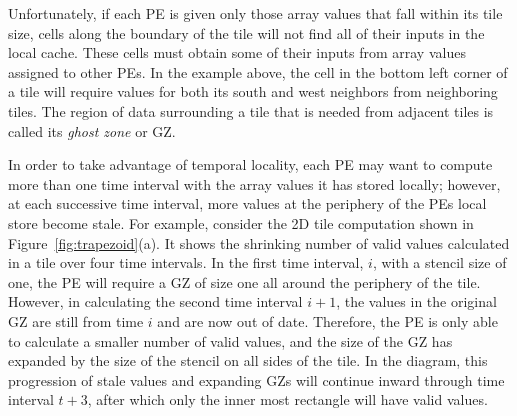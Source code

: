 \documentclass{sig-alternate}
\begin{document}
Unfortunately, if each PE is given only those array values that fall within
its tile size, cells along the boundary of the tile will not find all of
their inputs in the local cache.  These cells must obtain some of their
inputs from array values assigned to other PEs.  In the example above, the
cell in the bottom left corner of a tile will require values for both its
south and west neighbors from neighboring tiles.  The region of data
surrounding a tile that is needed from adjacent tiles is called its {\em
  ghost zone} or GZ.

In order to take advantage of temporal locality, each PE may want to compute
more than one time interval with the array values it has stored locally;
however, at each successive time interval, more values at the periphery of
the PEs local store become stale.  For example, consider the 2D tile
computation shown in Figure~\ref{fig:trapezoid}(a).  It shows the shrinking
number of valid values calculated in a tile over four time intervals.  In the
first time interval, $i$, with a stencil size of one, the PE will require a GZ
of size one all around the periphery of the tile.  However, in calculating
the second time interval $i+1$, the values in the original GZ are still from
time $i$ and are now out of date.  Therefore, the PE is only able to
calculate a smaller number of valid values, and the size of the GZ has
expanded by the size of the stencil on all sides of the tile.  In the
diagram, this progression of stale values and expanding GZs will continue
inward through time interval $t+3$, after which only the inner most rectangle
will have valid values.
\end{document}
